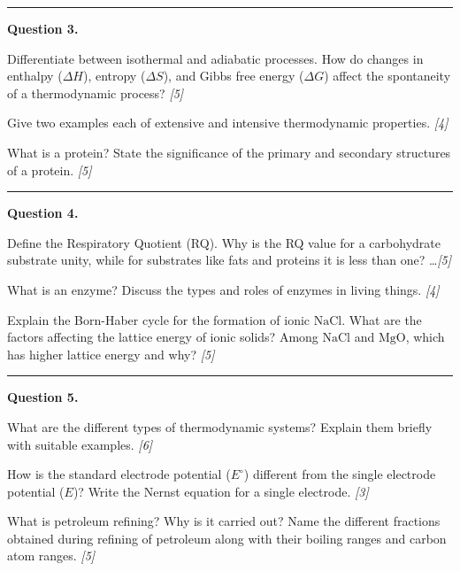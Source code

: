 \documentclass[11pt,a4paper]{article}
\newcommand{\pts}[1]{\hfill   \textit{[#1]}}
\begin{document}
\medskip\rule{\linewidth}{0.2pt}




\noindent   \textbf{Question 3.}

\begin{parts}
  \item Differentiate between isothermal and adiabatic processes. How do changes in enthalpy ($\Delta H$), entropy ($\Delta S$), and Gibbs free energy ($\Delta G$) affect the spontaneity of a thermodynamic process? \pts{5}
  \item Give two examples each of extensive and intensive thermodynamic properties. \pts{4}
  \item What is a protein? State the significance of the primary and secondary structures of a protein. \pts{5}
\end{parts}

\medskip\rule{\linewidth}{0.2pt}




\noindent   \textbf{Question 4.}

\begin{parts}
  \item Define the Respiratory Quotient (RQ). Why is the RQ value for a carbohydrate substrate unity, while for substrates like fats and proteins it is less than one? \dots \pts{5}
  \item What is an enzyme? Discuss the types and roles of enzymes in living things. \pts{4}
  \item Explain the Born-Haber cycle for the formation of ionic $ \text{NaCl}$. What are the factors affecting the lattice energy of ionic solids? Among $ \text{NaCl}$ and $ \text{MgO}$, which has higher lattice energy and why? \pts{5}
\end{parts}

\medskip\rule{\linewidth}{0.2pt}




\noindent   \textbf{Question 5.}

\begin{parts}
  \item What are the different types of thermodynamic systems? Explain them briefly with suitable examples. \pts{6}
  \item How is the standard electrode potential ($E^\circ$) different from the single electrode potential ($E$)? Write the Nernst equation for a single electrode. \pts{3}
  \item What is petroleum refining? Why is it carried out? Name the different fractions obtained during refining of petroleum along with their boiling ranges and carbon atom ranges. \pts{5}
\end{parts}
\end{document}
